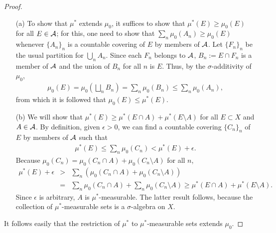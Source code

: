 \begin{proof}
    \begin{enumerate}
        \item[(a)]
        {
            To show that $\mu^*$ extends $\mu_0$, it suffices to show that $\mu^*(E)\geq\mu_0(E)$ for all $E\in{\mathcal{A}}$; for this, one need to show that $\sum_n\mu_0(A_n)\geq\mu_0(E)$ whenever $\{A_n\}_n$ is a countable covering of $E$ by members of ${\mathcal{A}}$.
            Let $\{F_n\}_n$ be the usual partition for $\bigcup_n A_n$.
            Since each $F_n$ belongs to ${\mathcal{A}}$, $B_n:=E\cap F_n$ is a member of ${\mathcal{A}}$ and the union of $B_n$ for all $n$ is $E$.
            Thus, by the $\sigma$-additivity of $\mu_0$,
            \begin{align*}
                \mu_0(E)=\mu_0\left(\bigsqcup_n B_n\right)=\sum_n\mu_0(B_n)\leq\sum_n\mu_0(A_n),
            \end{align*}
            from which it is followed that $\mu_0(E)\leq\mu^*(E)$.
        }
        \item[(b)]
        {
            We will show that $\mu^*(E)\geq\mu^*(E\cap A)+\mu^*(E\setminus A)$ for all $E\subset X$ and $A\in{\mathcal{A}}$.
            By definition, given $\epsilon>0$, we can find a countable covering $\{C_n\}_n$ of $E$ by members of ${\mathcal{A}}$ such that
            \begin{align*}
                \mu^*(E)\leq\sum_n\mu_0(C_n)<\mu^*(E)+\epsilon.
            \end{align*}
            Because $\mu_0(C_n)=\mu_0(C_n\cap A)+\mu_0(C_n\setminus A)$ for all $n$,
            \begin{eqnarray*}
                \mu^*(E)+\epsilon&>&\sum_n(\mu_0(C_n\cap A)+\mu_0(C_n\setminus A))\\
                &=&\sum_n\mu_0(C_n\cap A)+\sum_n\mu_0(C_n\setminus A)\geq\mu^*(E\cap A)+\mu^*(E\setminus A).
            \end{eqnarray*}
            Since $\epsilon$ is arbitrary, $A$ is $\mu^*$-measurable.
            The latter result follows, because the collection of $\mu^*$-measurable sets is a $\sigma$-algebra on $X$.
        }
    \end{enumerate}
    It follows easily that the restriction of $\mu^*$ to $\mu^*$-measurable sets extends $\mu_0$.
\end{proof}

